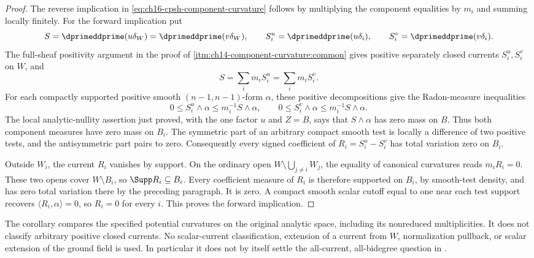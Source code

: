 \begin{proof}
The reverse implication in
\eqref{eq:ch16-cpsh-component-curvature} follows by multiplying the
component equalities by $m_i$ and summing locally finitely.
For the forward implication put
\[
 S=\dprimeddprime(u\delta_W)=\dprimeddprime(v\delta_W),
 \qquad S_i^u=\dprimeddprime(u\delta_i),\qquad
        S_i^v=\dprimeddprime(v\delta_i).
\]
The full-sheaf positivity argument in the proof of
\cref{itm:ch14-component-curvature:common} gives positive separately
closed currents $S_i^u,S_i^v$ on $W$, and
\[
                    S=\sum_i m_iS_i^u=\sum_i m_iS_i^v .
\]
For each compactly supported positive smooth
$(n-1,n-1)$-form $\alpha$, these positive decompositions give the
Radon-measure inequalities
\[
 0\leq S_i^u\wedge\alpha\leq m_i^{-1}S\wedge\alpha,
 \qquad
 0\leq S_i^v\wedge\alpha\leq m_i^{-1}S\wedge\alpha.
\]
The local analytic-nullity assertion just proved, with the one factor
$u$ and $Z=B$, says that $S\wedge\alpha$ has zero mass on $B$.
Thus both component measures have zero mass on $B_i$.
The symmetric part of an arbitrary compact smooth test is locally a
difference of two positive tests, and the antisymmetric part pairs to
zero.  Consequently every signed coefficient of
$R_i=S_i^u-S_i^v$ has total variation zero on $B_i$.

Outside $W_i$, the current $R_i$ vanishes by support.  On the ordinary
open $W\setminus\bigcup_{j\ne i}W_j$, the equality of canonical
curvatures reads $m_iR_i=0$.  These two opens cover $W\setminus B_i$,
so $\Supp R_i\subseteq B_i$.
Every coefficient measure of $R_i$ is therefore supported on $B_i$,
by smooth-test density, and has zero total variation there by the
preceding paragraph.  It is zero.
A compact smooth scalar cutoff equal to one near each test support
recovers $\langle R_i,\alpha\rangle=0$, so $R_i=0$ for every $i$.
This proves the forward implication.
\end{proof}

The corollary compares the specified potential curvatures on the
original analytic space, including its nonreduced multiplicities.
It does not classify arbitrary positive closed currents.
No scalar-current classification, extension of a current from $W$,
normalization pullback, or scalar extension of the ground field is used.
In particular it does not by itself settle the all-current,
all-bidegree question in .
